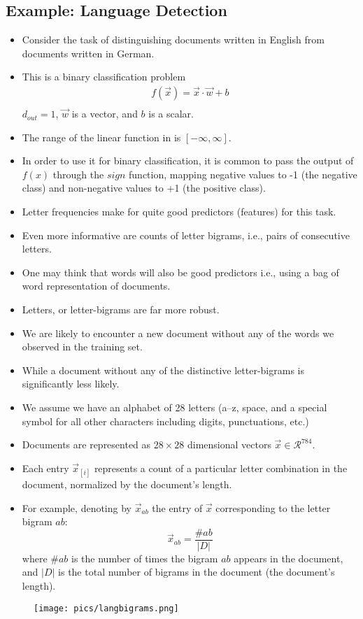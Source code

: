 \subsection{Example: Language Detection}
\begin{itemize}
\item Consider the task of distinguishing documents written in English from documents written in German.
\item This is a binary classification problem 
\begin{equation}
\begin{split}
f(\vec{x}) = \vec{x} \cdot \vec{w} + b\\
\end{split}
\end{equation}
 $d_{out}=1$, $\vec{w}$ is a vector, and $b$ is a scalar. 

 \item The range of the linear function in is $[-\infty,\infty]$.
 \item In order to use it for binary classification, it is common to pass the output of $f(x)$ through the $sign$ function, mapping negative values to -1 (the negative class) and non-negative values to +1 (the positive class).
\item Letter frequencies make for quite good predictors (features) for this task.
\item Even more informative are counts of letter bigrams, i.e., pairs of consecutive letters.
\item One may think that words will also be good predictors i.e., using a bag of word representation of documents.
\item Letters, or letter-bigrams are far more robust.
\item We are likely to encounter a new document without any of the words we observed in the training set.
\item While a document without any of the distinctive letter-bigrams is significantly less likely. \cite{goldberg2017neural}
\item We assume we have an alphabet of 28 letters (a–z, space, and a special symbol for all other characters including digits, punctuations, etc.)
\item Documents are represented as $28\times28$ dimensional vectors $\vec{x} \in \mathcal{R}^{784}$.
\item Each entry $\vec{x}_{[i]}$  represents a count of a particular letter combination in the document, normalized by the document's length.
\item For example, denoting by $\vec{x}_{ab}$ the entry of $\vec{x}$ corresponding to the letter bigram $ab$:
\begin{equation}
 \vec{x}_{ab}= \frac{\#ab}{|D|}
\end{equation}
where $\#ab$ is the number of times the bigram $ab$ appears in the document, and $|D|$ is the total number of bigrams in the document (the document’s length).
\end{itemize}
\begin{figure}[htb]
	\centering
	 \texttt{[image: pics/langbigrams.png]}
\end{figure}

